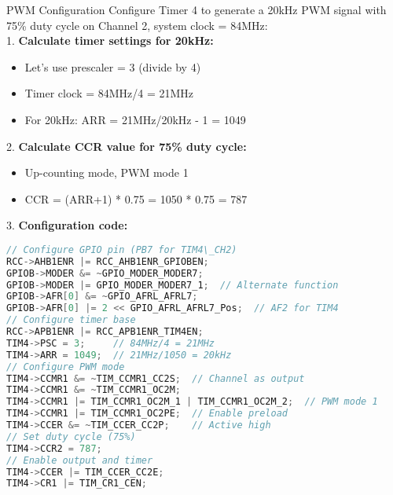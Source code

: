 \begin{example2}{PWM Configuration}
Configure Timer 4 to generate a 20kHz PWM signal with 75\% duty cycle on Channel 2, system clock = 84MHz:\\
1. \textbf{Calculate timer settings for 20kHz:}
\begin{itemize}
    \item Let's use prescaler = 3 (divide by 4)
    \item Timer clock = 84MHz/4 = 21MHz
    \item For 20kHz: ARR = 21MHz/20kHz - 1 = 1049
\end{itemize}
2. \textbf{Calculate CCR value for 75\% duty cycle:}
\begin{itemize}
    \item Up-counting mode, PWM mode 1
    \item CCR = (ARR+1) * 0.75 = 1050 * 0.75 = 787
\end{itemize}
3. \textbf{Configuration code:}
\begin{lstlisting}[language=C, style=basesmol]
// Configure GPIO pin (PB7 for TIM4\_CH2)
RCC->AHB1ENR |= RCC_AHB1ENR_GPIOBEN;
GPIOB->MODER &= ~GPIO_MODER_MODER7;
GPIOB->MODER |= GPIO_MODER_MODER7_1;  // Alternate function
GPIOB->AFR[0] &= ~GPIO_AFRL_AFRL7;
GPIOB->AFR[0] |= 2 << GPIO_AFRL_AFRL7_Pos;  // AF2 for TIM4
// Configure timer base
RCC->APB1ENR |= RCC_APB1ENR_TIM4EN;
TIM4->PSC = 3;     // 84MHz/4 = 21MHz
TIM4->ARR = 1049;  // 21MHz/1050 = 20kHz
// Configure PWM mode
TIM4->CCMR1 &= ~TIM_CCMR1_CC2S;  // Channel as output
TIM4->CCMR1 &= ~TIM_CCMR1_OC2M;
TIM4->CCMR1 |= TIM_CCMR1_OC2M_1 | TIM_CCMR1_OC2M_2;  // PWM mode 1
TIM4->CCMR1 |= TIM_CCMR1_OC2PE;  // Enable preload
TIM4->CCER &= ~TIM_CCER_CC2P;    // Active high
// Set duty cycle (75%)
TIM4->CCR2 = 787;
// Enable output and timer
TIM4->CCER |= TIM_CCER_CC2E;
TIM4->CR1 |= TIM_CR1_CEN;
\end{lstlisting}
\end{example2}



